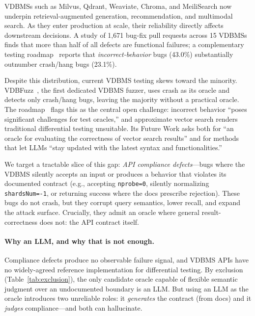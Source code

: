 \documentclass[sigconf]{acmart}
\begin{document}
VDBMSs such as Milvus, Qdrant, Weaviate, Chroma, and MeiliSearch now underpin retrieval-augmented generation, recommendation, and multimodal search. As they enter production at scale, their reliability directly affects downstream decisions. A study of 1{,}671 bug-fix pull requests across 15 VDBMSs~\cite{bugstudy25} finds that more than half of all defects are functional failures; a complementary testing roadmap~\cite{roadmap25} reports that \emph{incorrect-behavior} bugs (43.0\%) substantially outnumber crash/hang bugs (23.1\%).

Despite this distribution, current VDBMS testing skews toward the minority. VDBFuzz~\cite{vdbfuzz26}, the first dedicated VDBMS fuzzer, uses crash as its oracle and detects only crash/hang bugs, leaving the majority without a practical oracle. The roadmap~\cite{roadmap25} flags this as the central open challenge: incorrect behavior ``poses significant challenges for test oracles,'' and approximate vector search renders traditional differential testing unsuitable. Its Future Work asks both for ``an oracle for evaluating the correctness of vector search results'' and for methods that let LLMs ``stay updated with the latest syntax and functionalities.''

We target a tractable slice of this gap: \emph{API compliance defects}---bugs where the VDBMS silently accepts an input or produces a behavior that violates its documented contract (e.g., accepting \texttt{nprobe=0}, silently normalizing \texttt{shardsNum=-1}, or returning success where the docs prescribe rejection). These bugs do not crash, but they corrupt query semantics, lower recall, and expand the attack surface. Crucially, they admit an oracle where general result-correctness does not: the API contract itself.

\paragraph{Why an LLM, and why that is not enough.}
Compliance defects produce no observable failure signal, and VDBMS APIs have no widely-agreed reference implementation for differential testing. By exclusion (Table~\ref{tab:exclusion}), the only candidate oracle capable of flexible semantic judgment over an undocumented boundary is an LLM. But using an LLM as the oracle introduces two unreliable roles: it \emph{generates} the contract (from docs) and it \emph{judges} compliance---and both can hallucinate.
\end{document}
